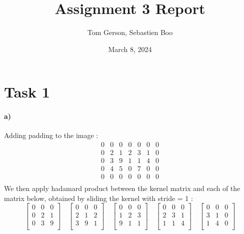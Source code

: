 \documentclass{article}
\title{Assignment 3 Report}
\author{Tom Gerson, Sebastien Boo}
\date{March 8, 2024}
\begin{document}
	
	\maketitle
	
	
	\section*{Task 1}
		\paragraph{a)}
		Adding padding to the image : 
		\[
		\begin{matrix}
			0 & 0 & 0 & 0 & 0 & 0 & 0 \\
			0 & 2 & 1 & 2 & 3 & 1 & 0\\
			0 & 3 & 9 & 1 & 1 & 4 & 0\\
			0 & 4 & 5 & 0 & 7 & 0 & 0\\
			0 & 0 & 0 & 0 & 0 & 0 & 0\\
		\end{matrix}
		\]
		We then apply hadamard product between the kernel matrix and each of the matrix below, obtained by sliding the kernel with stride = 1 :
		\[
		\begin{bmatrix}
			0 & 0 & 0 \\
			0 & 2 & 1 \\
			0 & 3 & 9 \\
		\end{bmatrix}
		\quad
		\begin{bmatrix}
			0 & 0 & 0 \\
			2 & 1 & 2 \\
			3 & 9 & 1 \\
		\end{bmatrix}
		\quad
		\begin{bmatrix}
			0 & 0 & 0 \\
			1 & 2 & 3 \\
			9 & 1 & 1 \\
		\end{bmatrix}
		\quad
		\begin{bmatrix}
			0 & 0 & 0 \\
			2 & 3 & 1 \\
			1 & 1 & 4 \\
		\end{bmatrix}
		\quad
		\begin{bmatrix}
			0 & 0 & 0 \\
			3 & 1 & 0 \\
			1 & 4 & 0 \\
		\end{bmatrix}
		\]
\end{document}
